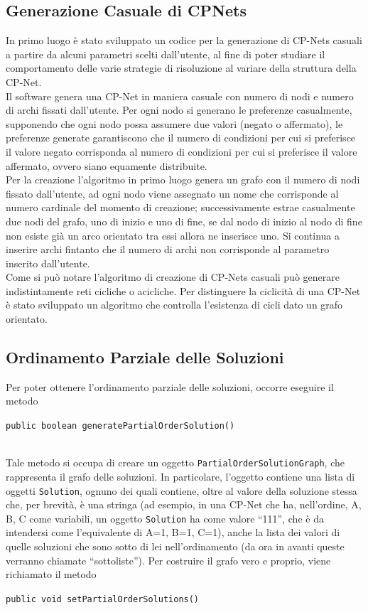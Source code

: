 \documentclass[a4paper,titlepage]{article}
\begin{document}
\subsection{Generazione Casuale di CPNets}
In primo luogo è stato sviluppato un codice per la generazione di CP-Nets casuali a partire da alcuni parametri scelti dall'utente, al fine di poter studiare il comportamento delle varie strategie di risoluzione al variare della struttura della CP-Net.\\
Il software genera una CP-Net in maniera casuale con numero di nodi e numero di archi fissati dall'utente. Per ogni nodo si generano le preferenze casualmente, supponendo che ogni nodo possa assumere due valori (negato o affermato), le preferenze generate garantiscono che il numero di condizioni per cui si preferisce il valore negato corrisponda al numero di condizioni per cui si preferisce il valore affermato, ovvero siano equamente distribuite.\\
Per la creazione l'algoritmo in primo luogo genera un grafo con il numero di nodi fissato dall'utente, ad ogni nodo viene assegnato un nome che corrisponde al numero cardinale del momento di creazione; successivamente estrae casualmente due nodi del grafo, uno di inizio e uno di fine, se dal nodo di inizio al nodo di fine non esiste già un arco orientato tra essi allora ne inserisce uno. Si continua a inserire archi fintanto che il numero di archi non corrisponde al parametro inserito dall'utente.\\
Come si può notare l'algoritmo di creazione di CP-Nets casuali può generare indistintamente reti cicliche o acicliche. Per distinguere la ciclicità di una CP-Net è stato sviluppato un algoritmo che controlla l'esistenza di cicli dato un grafo orientato.

\subsection{Ordinamento Parziale delle Soluzioni}

Per poter ottenere l'ordinamento parziale delle soluzioni, occorre eseguire il metodo
\\
\centerline{\texttt{public boolean generatePartialOrderSolution()}}
\\

Tale metodo si occupa di creare un oggetto \texttt{PartialOrderSolutionGraph}, che rappresenta il grafo delle soluzioni. In particolare,  l'oggetto contiene una lista di oggetti \texttt{Solution}, ognuno dei quali contiene, oltre al valore della soluzione stessa che, per brevità, è una stringa (ad esempio, in una CP-Net che ha, nell'ordine, A, B, C come variabili, un oggetto \texttt{Solution} ha come valore ``111'', che è da intendersi come l'equivalente di {A=1, B=1, C=1}), anche la lista dei valori di quelle soluzioni che sono sotto di lei nell'ordinamento (da ora in avanti queste verranno chiamate ``sottoliste'').
Per costruire il grafo vero e proprio, viene richiamato il metodo 
\\
\centerline{\texttt{public void setPartialOrderSolutions()}}
\\
\end{document}
